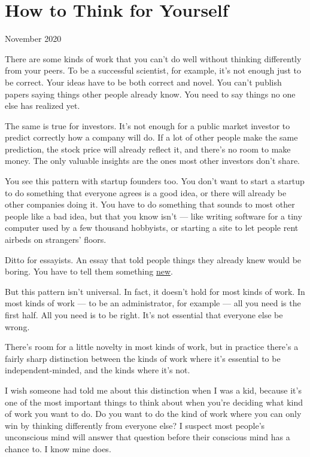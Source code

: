 \chapter{How to Think for Yourself}

November 2020

There are some kinds of work that you can't do well without thinking
differently from your peers. To be a successful scientist, for example,
it's not enough just to be correct. Your ideas have to be both correct
and novel. You can't publish papers saying things other people already
know. You need to say things no one else has realized yet.

The same is true for investors. It's not enough for a public market
investor to predict correctly how a company will do. If a lot of other
people make the same prediction, the stock price will already reflect
it, and there's no room to make money. The only valuable insights are
the ones most other investors don't share.

You see this pattern with startup founders too. You don't want to start
a startup to do something that everyone agrees is a good idea, or there
will already be other companies doing it. You have to do something that
sounds to most other people like a bad idea, but that you know isn't ---
like writing software for a tiny computer used by a few thousand
hobbyists, or starting a site to let people rent airbeds on strangers'
floors.

Ditto for essayists. An essay that told people things they already knew
would be boring. You have to tell them something
\href{useful.html}{new}.

But this pattern isn't universal. In fact, it doesn't hold for most
kinds of work. In most kinds of work --- to be an administrator, for
example --- all you need is the first half. All you need is to be right.
It's not essential that everyone else be wrong.

There's room for a little novelty in most kinds of work, but in practice
there's a fairly sharp distinction between the kinds of work where it's
essential to be independent-minded, and the kinds where it's not.

I wish someone had told me about this distinction when I was a kid,
because it's one of the most important things to think about when you're
deciding what kind of work you want to do. Do you want to do the kind of
work where you can only win by thinking differently from everyone else?
I suspect most people's unconscious mind will answer that question
before their conscious mind has a chance to. I know mine does.

